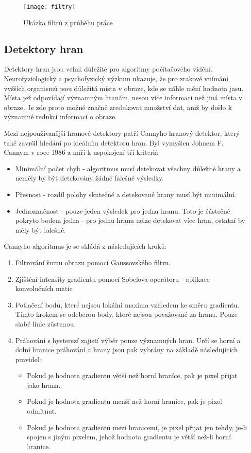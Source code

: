 \begin{figure}[h]
	\texttt{[image: filtry]}
	\centering
	\caption{Ukázka filtrů z průběhu práce}\label{fig:filtry}
\end{figure}

\subsection{Detektory hran}
Detektory hran jsou velmi důležité pro algoritmy počítačového vidění. Neurofyziologický a psychofyzický výzkum ukazuje, že pro zrakové vnímání vyšších organismů jsou důležitá místa v obraze, kde se náhle mění hodnota jasu. Místa jež odpovídají významným hranám, nesou více informací než jiná místa v obraze. Je zde proto možné značně zredukovat množství dat, aniž by došlo k významné redukci informací o obraze.\cite{image}

Mezi nejpoužívanější hranové detektory patří Cannyho hranový detektor, který také završil hledání po ideálním detektoru hran. Byl vymyšlen Johnem F. Cannym v roce 1986 a míří k uspokojení tří kriterií:
\begin{itemize}
	\item Minimální počet chyb - algoritmus musí detekovat všechny důležité hrany a neměly by být detekovány žádné falešné výsledky.
	\item Přesnost - rozdíl polohy skutečné a detekované hrany musí být minimální.
	\item Jednoznačnost - pouze jeden výsledek pro jednu hranu. Toto je částečně pokryto bodem jedna - pro jednu hranu nelze detekovat více hran, ostatní by měly být falešné.
\end{itemize}

Cannyho algoritmus je se skládá z následujících kroků:
\begin{enumerate}
	\item Filtrování šumu obrazu pomocí Gaussovského filtru.
	\item Zjištění intensity gradientu pomocí Sobelova operátoru - aplikace konvolučních matic
	\item Potlačení bodů, které nejsou lokální maxima vzhledem ke směru gradientu. Tímto krokem se odeberou body, které nejsou považované za hranu. Pouze slabé linie zůstanou.
	\item Práhování s hysterezí zajistí výběr pouze významných hran. Určí se horní a dolní hranice práhování a hrany jsou pak vybrány na základě následujících pravidel:
	\begin{itemize}
		\item Pokud je hodnota gradientu větší než horní hraníce, pak je pixel přijat jako hrana.
		\item Pokud je hodnota gradientu menší než horní hraníce, pak je pixel odmítnut.
		\item Pokud je hodnota gradientu mezi hranicemi, je pixel přijat jen tehdy, je-li spojen s jiným pixelem, jehož hodnota gradientu je větší než-li horní hranice.
	\end{itemize}
\end{enumerate}

